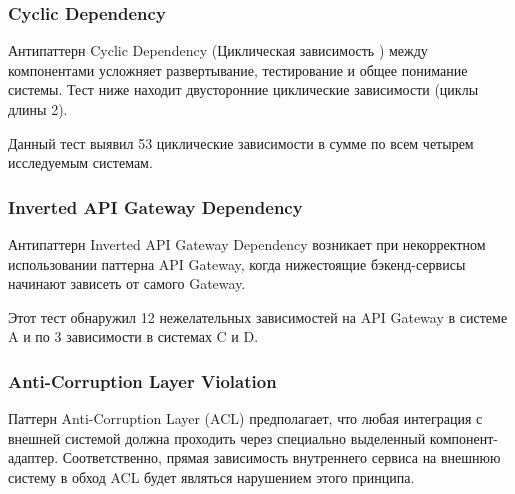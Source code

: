 \subsubsection{Cyclic Dependency}

Антипаттерн Cyclic Dependency (Циклическая зависимость \cite{cyclic-dep-ap}) между компонентами усложняет развертывание, тестирование и общее понимание системы. Тест ниже находит двусторонние циклические зависимости (циклы длины 2).


Данный тест выявил 53 циклические зависимости в сумме по всем четырем исследуемым системам. 

\subsubsection{Inverted API Gateway Dependency}

Антипаттерн Inverted API Gateway Dependency \cite{api-gateway-pattern} возникает при некорректном использовании паттерна API Gateway, когда нижестоящие бэкенд-сервисы начинают зависеть от самого Gateway. 


Этот тест обнаружил 12 нежелательных зависимостей на API Gateway в системе A и по 3 зависимости в системах C и D.

\subsubsection{Anti-Corruption Layer Violation}

Паттерн Anti-Corruption Layer (ACL) предполагает, что любая интеграция с внешней системой должна проходить через специально выделенный компонент-адаптер. Соответственно, прямая зависимость внутреннего сервиса на внешнюю систему в обход ACL будет являться нарушением этого принципа. 

